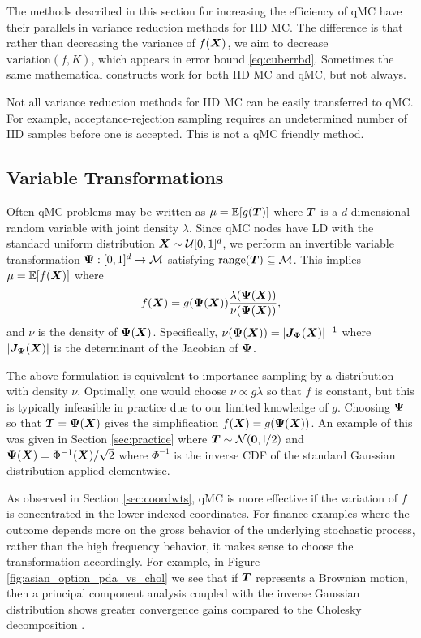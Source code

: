 \documentclass{svproc}
\begin{document}
The methods described in this section for increasing the efficiency of qMC have their parallels in variance reduction methods for IID MC.  The difference is that rather than decreasing the variance of $f({\boldsymbol{X}})$, we aim to decrease  $\text{variation}(f,K)$, which appears in error bound \eqref{eq:cuberrbd}. Sometimes the same mathematical constructs work for both IID MC and qMC, but not always.

Not all variance reduction methods for IID MC can be easily transferred to qMC.  For example, acceptance-rejection sampling requires an undetermined number of IID samples before one is accepted.  This is not a qMC friendly method.


\subsection{Variable Transformations} 

Often qMC problems may be written as $\mu = {\mathbb{E}}[g({\boldsymbol{T}})]$ where ${\boldsymbol{T}}$ is a $d$-dimensional random variable with joint density $\lambda$. Since qMC nodes have LD with the standard uniform distribution ${\boldsymbol{X}} \sim {\mathcal{U}}[0,1]^d$, we perform an invertible variable transformation ${\boldsymbol{\Psi}}: [0,1]^d \to {\mathcal{M}}$ satisfying $\mathrm{range}({\boldsymbol{T}}) \subseteq {\mathcal{M}}$. This implies
$\mu = {\mathbb{E}}[f({\boldsymbol{X}})]$ where  
$$
f({\boldsymbol{X}}) = g({\boldsymbol{\Psi}}({\boldsymbol{X}})) \frac{\lambda ({\boldsymbol{\Psi}}({\boldsymbol{X}}))}{\nu({\boldsymbol{\Psi}}({\boldsymbol{X}}))},
$$
and $\nu$ is the density of ${\boldsymbol{\Psi}}({\boldsymbol{X}})$. Specifically, $\nu({\boldsymbol{\Psi}}({\boldsymbol{X}}))= \lvert {\boldsymbol{J}}_{\boldsymbol{\Psi}}({\boldsymbol{X}}) \rvert^{-1}$ where $\lvert {\boldsymbol{J}}_{\boldsymbol{\Psi}}({\boldsymbol{X}}) \rvert$ is the determinant of the Jacobian of ${\boldsymbol{\Psi}}$. 

The above formulation is equivalent to importance sampling by a distribution with density $\nu$. Optimally, one would choose $\nu \propto g\lambda$ so that $f$ is constant, but this is typically infeasible in practice due to our limited knowledge of $g$. Choosing ${\boldsymbol{\Psi}}$ so that ${\boldsymbol{T}} = {\boldsymbol{\Psi}}({\boldsymbol{X}})$ gives the simplification $f({\boldsymbol{X}}) = g({\boldsymbol{\Psi}}({\boldsymbol{X}}))$. An example of this was given in Section \ref{sec:practice} where ${\boldsymbol{T}} \sim {\mathcal{N}}(\boldsymbol{0},\mathsf{I}/2)$ and ${\boldsymbol{\Psi}}({\boldsymbol{X}}) = \Phi^{-1}({\boldsymbol{X}})/\sqrt{2}$ where $\Phi^{-1}$ is the inverse CDF of the standard Gaussian distribution applied elementwise.

As observed in Section \ref{sec:coordwts}, qMC is more effective if the variation of $f$ is concentrated in the lower indexed coordinates.  For finance examples where the outcome depends more on the gross behavior of the underlying stochastic process, rather than the high frequency behavior, it makes sense to choose the transformation accordingly. For example, in Figure \ref{fig:asian_option_pda_vs_chol} we see that if  ${\boldsymbol{T}}$ represents a Brownian motion, then a principal component analysis coupled with the inverse Gaussian distribution shows greater convergence gains compared to the Cholesky decomposition \cite{AcwBroGla97}.
\end{document}
